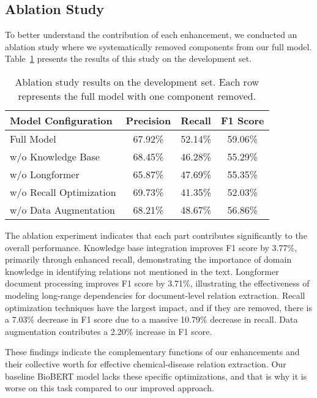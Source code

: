 \documentclass{amia}
\begin{document}
\subsection*{Ablation Study}

To better understand the contribution of each enhancement, we conducted an ablation study where we systematically removed components from our full model. Table~\ref{tab:ablation} presents the results of this study on the development set.

\begin{table}[H]
\begin{center}
\begin{tabular}{|l|c|c|c|}
\hline
\textbf{Model Configuration} & \textbf{Precision} & \textbf{Recall} & \textbf{F1 Score} \\
\hline
Full Model & 67.92\% & 52.14\% & 59.06\% \\
\hline
w/o Knowledge Base & 68.45\% & 46.28\% & 55.29\% \\
\hline
w/o Longformer & 65.87\% & 47.69\% & 55.35\% \\
\hline
w/o Recall Optimization & 69.73\% & 41.35\% & 52.03\% \\
\hline
w/o Data Augmentation & 68.21\% & 48.67\% & 56.86\% \\
\hline
\end{tabular}
\end{center}
\caption{Ablation study results on the development set. Each row represents the full model with one component removed.}
\label{tab:ablation}
\end{table}

The ablation experiment indicates that each part contributes significantly to the overall performance. Knowledge base integration improves F1 score by 3.77\%, primarily through enhanced recall, demonstrating the importance of domain knowledge in identifying relations not mentioned in the text. Longformer document processing improves F1 score by 3.71\%, illustrating the effectiveness of modeling long-range dependencies for document-level relation extraction. Recall optimization techniques have the largest impact, and if they are removed, there is a 7.03\% decrease in F1 score due to a massive 10.79\% decrease in recall. Data augmentation contributes a 2.20\% increase in F1 score.

These findings indicate the complementary functions of our enhancements and their collective worth for effective chemical-disease relation extraction. Our baseline BioBERT model lacks these specific optimizations, and that is why it is worse on this task compared to our improved approach.
\end{document}
